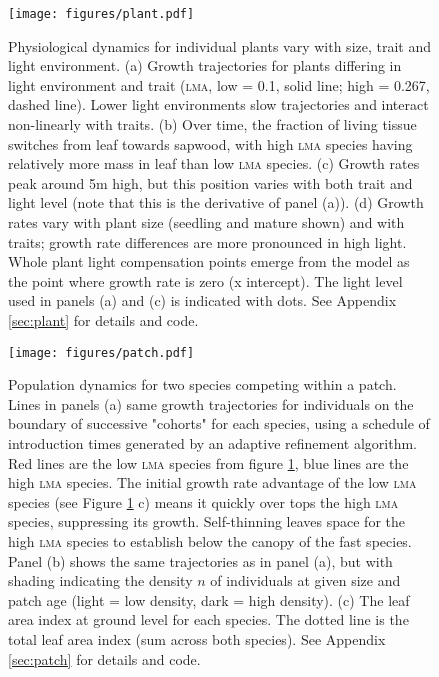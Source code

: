 \documentclass[a4paper,11pt]{article}
\begin{document}
\newpage

\begin{figure}[h!]
\centering
\texttt{[image: figures/plant.pdf]}
\caption{Physiological dynamics for individual plants vary with size, trait
and light environment. (a) Growth trajectories for plants differing in light
environment and trait (\textsc{lma}, low = 0.1, solid line; high =  0.267, dashed
line). Lower light environments slow trajectories and interact non-linearly
with traits. (b) Over time, the fraction of living tissue switches from leaf
towards sapwood, with high \textsc{lma} species having relatively more mass in leaf
than low \textsc{lma} species. (c) Growth rates peak around 5m high, but this position
varies with both trait and light level (note that this is the derivative of
panel (a)). (d) Growth rates vary with plant size (seedling and mature shown)
and with traits; growth rate differences are more pronounced in high light.
Whole plant light compensation points emerge from the model as the point where
growth rate is zero (x intercept).  The light level used in panels (a) and (c)
is indicated with dots.  See Appendix \ref{sec:plant} for details and code.}
\label{fig:plant}
\end{figure}

\newpage

\begin{figure}[h!]
\centering
\texttt{[image: figures/patch.pdf]}
\caption{Population dynamics for two species competing within a patch. Lines
in panels (a) same growth trajectories for individuals on the
boundary of successive "cohorts" for each species, using a schedule of 
introduction times generated by an adaptive refinement algorithm.
 Red lines are the low \textsc{lma}
species from figure \ref{fig:plant}, blue lines are the high \textsc{lma} species.  The
initial growth rate advantage of the low \textsc{lma} species (see Figure
\ref{fig:plant} c) means it quickly over tops the high \textsc{lma} species,
suppressing its growth.  Self-thinning leaves space for the high \textsc{lma} species
to establish below the canopy of the fast species. Panel (b) shows the same
trajectories as in panel (a), but with shading indicating the density $n$ of
individuals at given size and patch age (light = low density, dark = high density).  
(c) The leaf area index at ground
level for each species.  The dotted line is the total leaf area index (sum
across both species). See Appendix \ref{sec:patch} for details and code.}
\label{fig:patch}
\end{figure}
\end{document}
